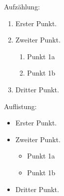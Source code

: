 \documentclass[a5paper,12pt]{article}
\begin{document}
Aufzählung: \\ 
 \begin{enumerate}
  \item Erster Punkt.
  \item Zweiter Punkt.
  \begin{enumerate}
    \item Punkt 1a
    \item Punkt 1b    
  \end{enumerate}  
  \item Dritter Punkt.
 \end{enumerate}
Auflistung: \\
 \begin{itemize}
  \item Erster Punkt.
  \item Zweiter Punkt.
  \begin{itemize}
    \item Punkt 1a
    \item Punkt 1b    
  \end{itemize}  
  \item Dritter Punkt.
 \end{itemize}  
\end{document}
